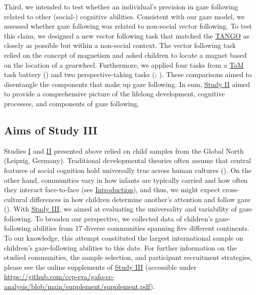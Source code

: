 \documentclass[
]{scrbook}
\begin{document}
Third, we intended to test whether an individual's precision in gaze following related to other (social-) cognitive abilities. Consistent with our gaze model, we assessed whether gaze following was related to non-social vector following. To test this claim, we designed a new vector following task that matched the \hyperref[acronyms_TANGO]{TANGO} as closely as possible but within a non-social context. The vector following task relied on the concept of magnetism and asked children to locate a magnet based on the location of a gearwheel. Furthermore, we applied four tasks from a \hyperref[acronyms_ToM]{ToM} task battery () and two perspective-taking tasks (; ). These comparisons aimed to disentangle the components that make up gaze following. In sum, \hyperref[studyII]{Study II} aimed to provide a comprehensive picture of the lifelong development, cognitive processes, and components of gaze following.

\subsection{Aims of Study III}\label{aims-studyIII}

Studies \hyperref[studyI]{I} and \hyperref[studyII]{II} presented above relied on child samples from the Global North (Leipzig, Germany). Traditional developmental theories often assume that central features of social cognition hold universally true across human cultures (). On the other hand, communities vary in how infants are typically carried and how often they interact face-to-face (see \hyperref[intro-gaze-cc]{Introduction}), and thus, we might expect cross-cultural differences in how children determine another's attention and follow gaze (). With \hyperref[studyIII]{Study III}, we aimed at evaluating the universality and variability of gaze following. To broaden our perspective, we collected data of children's gaze-following abilities from 17 diverse communities spanning five different continents. To our knowledge, this attempt constituted the largest international sample on children's gaze-following abilities to this date. For further information on the studied communities, the sample selection, and participant recruitment strategies, please see the online supplements of \hyperref[studyIII]{Study III} (accessible under \url{https://github.com/ccp-eva/gafo-cc-analysis/blob/main/supplement/supplement.pdf}).
\end{document}
